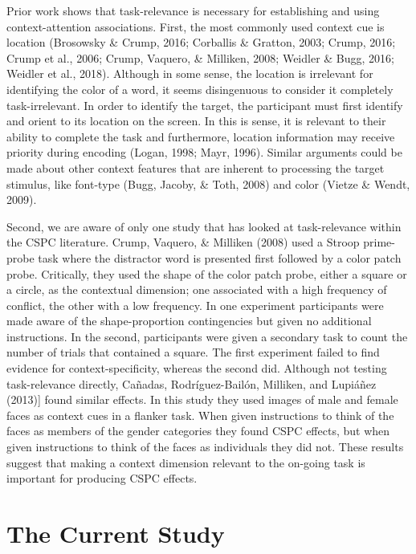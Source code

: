 \documentclass[english,,man,floatsintext]{apa6}
\begin{document}
Prior work shows that task-relevance is necessary for establishing and
using context-attention associations. First, the most commonly used
context cue is location (Brosowsky \& Crump, 2016; Corballis \& Gratton,
2003; Crump, 2016; Crump et al., 2006; Crump, Vaquero, \& Milliken,
2008; Weidler \& Bugg, 2016; Weidler et al., 2018). Although in some
sense, the location is irrelevant for identifying the color of a word,
it seems disingenuous to consider it completely task-irrelevant. In
order to identify the target, the participant must first identify and
orient to its location on the screen. In this is sense, it is relevant
to their ability to complete the task and furthermore, location
information may receive priority during encoding (Logan, 1998; Mayr,
1996). Similar arguments could be made about other context features that
are inherent to processing the target stimulus, like font-type (Bugg,
Jacoby, \& Toth, 2008) and color (Vietze \& Wendt, 2009).

Second, we are aware of only one study that has looked at task-relevance
within the CSPC literature. Crump, Vaquero, \& Milliken (2008) used a
Stroop prime-probe task where the distractor word is presented first
followed by a color patch probe. Critically, they used the shape of the
color patch probe, either a square or a circle, as the contextual
dimension; one associated with a high frequency of conflict, the other
with a low frequency. In one experiment participants were made aware of
the shape-proportion contingencies but given no additional instructions.
In the second, participants were given a secondary task to count the
number of trials that contained a square. The first experiment failed to
find evidence for context-specificity, whereas the second did. Although
not testing task-relevance directly, Cañadas, Rodríguez-Bailón,
Milliken, and Lupiáñez (2013){]} found similar effects. In this study
they used images of male and female faces as context cues in a flanker
task. When given instructions to think of the faces as members of the
gender categories they found CSPC effects, but when given instructions
to think of the faces as individuals they did not. These results suggest
that making a context dimension relevant to the on-going task is
important for producing CSPC effects.

\section{The Current Study}\label{the-current-study}
\end{document}
